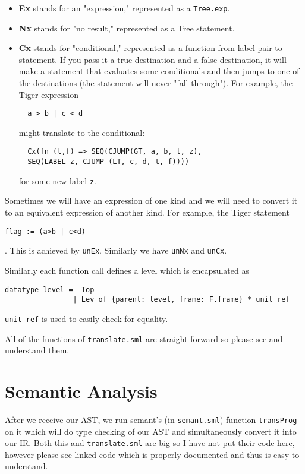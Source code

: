 \begin{itemize}

	\item \textbf{Ex} stands for an "expression," represented as a \texttt{Tree.exp}.
	\item \textbf{Nx} stands for "no result," represented as a Tree statement.
	\item \textbf{Cx} stands for "conditional," represented as a function from label-pair to  statement. If you pass it a true-destination and a false-destination, it will make a statement that evaluates some conditionals and then jumps to one of the  destinations (the statement will never "fall through"). For example, the Tiger expression
	      \begin{verbatim}
  a > b | c < d
  \end{verbatim}
	      might translate to the  conditional:
	      \begin{verbatim}
  Cx(fn (t,f) => SEQ(CJUMP(GT, a, b, t, z),
  SEQ(LABEL z, CJUMP (LT, c, d, t, f))))
  \end{verbatim}
	      for some new label \texttt{z}.
\end{itemize}

Sometimes we will have an expression of one kind and we will need to convert it to an equivalent expression of another kind. For example, the Tiger statement
\begin{verbatim}
flag := (a>b | c<d)
\end{verbatim}
. This is achieved by \texttt{unEx}. Similarly we have \texttt{unNx} and \texttt{unCx}.

Similarly each function call defines a level which is encapsulated as
\begin{verbatim}
datatype level =  Top
                | Lev of {parent: level, frame: F.frame} * unit ref
\end{verbatim}

\texttt{unit ref} is used to easily check for equality.

All of the functions of \texttt{translate.sml} are straight forward so please see and understand them.

\section{Semantic Analysis}


After we receive our AST, we run semant's (in \texttt{semant.sml}) function \texttt{transProg} on it which will do type checking of our AST and simultaneously convert it into our IR. Both this and \texttt{translate.sml} are big so I have not put their code here, however please see linked code which is properly documented and thus is easy to understand.